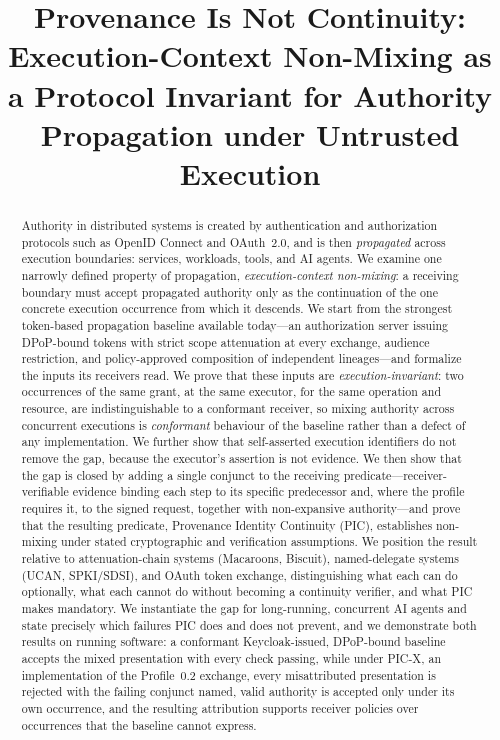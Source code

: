 \documentclass[conference]{IEEEtran}
\newcommand{\TODO}[1]{\textcolor{red}{\textbf{[TODO: #1]}}}
\begin{document}
\title{Provenance Is Not Continuity:\\Execution-Context Non-Mixing as a Protocol Invariant for Authority Propagation under Untrusted Execution}

\author{\IEEEauthorblockN{\TODO{Author(s)}}
\IEEEauthorblockA{\TODO{Affiliation}}}

\maketitle

\begin{abstract}
Authority in distributed systems is created by authentication and authorization protocols such as OpenID Connect and OAuth~2.0, and is then \emph{propagated} across execution boundaries: services, workloads, tools, and AI agents. We examine one narrowly defined property of propagation, \emph{execution-context non-mixing}: a receiving boundary must accept propagated authority only as the continuation of the one concrete execution occurrence from which it descends. We start from the strongest token-based propagation baseline available today---an authorization server issuing DPoP-bound tokens with strict scope attenuation at every exchange, audience restriction, and policy-approved composition of independent lineages---and formalize the inputs its receivers read. We prove that these inputs are \emph{execution-invariant}: two occurrences of the same grant, at the same executor, for the same operation and resource, are indistinguishable to a conformant receiver, so mixing authority across concurrent executions is \emph{conformant} behaviour of the baseline rather than a defect of any implementation. We further show that self-asserted execution identifiers do not remove the gap, because the executor's assertion is not evidence. We then show that the gap is closed by adding a single conjunct to the receiving predicate---receiver-verifiable evidence binding each step to its specific predecessor and, where the profile requires it, to the signed request, together with non-expansive authority---and prove that the resulting predicate, Provenance Identity Continuity (PIC), establishes non-mixing under stated cryptographic and verification assumptions. We position the result relative to attenuation-chain systems (Macaroons, Biscuit), named-delegate systems (UCAN, SPKI/SDSI), and OAuth token exchange, distinguishing what each can do optionally, what each cannot do without becoming a continuity verifier, and what PIC makes mandatory. We instantiate the gap for long-running, concurrent AI agents and state precisely which failures PIC does and does not prevent, and we demonstrate both results on running software: a conformant Keycloak-issued, DPoP-bound baseline accepts the mixed presentation with every check passing, while under PIC-X, an implementation of the Profile~0.2 exchange, every misattributed presentation is rejected with the failing conjunct named, valid authority is accepted only under its own occurrence, and the resulting attribution supports receiver policies over occurrences that the baseline cannot express.
\end{abstract}
\end{document}
